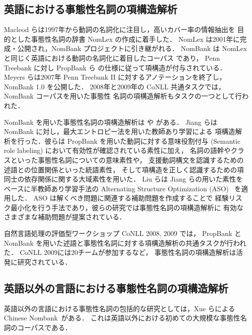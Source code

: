 \documentclass[japanese]{jnlp_1.4}
\begin{document}
\subsection{英語における事態性名詞の項構造解析}

Macleod らは1997年から動詞の名詞化に注目し，高いカバー率の情報抽出を
目的とした事態性名詞の辞書 NomLex の作成に着手した\cite{macleod:1997:RANLP}．
NomLex は2001年に完成・公開され，NomBank プロジェクトに引き継がれる．
NomBank は NomLex と同じく英語における動詞の名詞化に着目したコーパス
\cite{meyers:2004:NAACL-HLT,meyers:2004:LREC}
であり，
Penn Treebank \cite{marcus:1993:CL}に対し
PropBank ら \cite{palmer:2005:CL} の仕様に従って項構造が付与されている．
Meyers らは2007年 Penn Treebank II に対するアノテーションを終了し，
NomBank 1.0 を公開した．
2008年と2009年の CoNLL 共通タスクでは，NomBank コーパスを用いた事態性
名詞の項構造解析もタスクの一つとして行われた．

NomBank を用いた事態性名詞の項構造解析は \cite{jiang:2006:EMNLP}や 
\cite{liu:2007:ACL}がある．
Jiang らは NomBank に対し，最大エントロピー法を用いた教師あり学習による
項構造解析を行った．彼らは PropBank を用いた動詞に対する意味役割付与
(Semantic role labeling) において有効性が確認されている素性に加え，
名詞の語幹やクラスといった事態性名詞についての意味素性や，
支援動詞構文を認識するための述語との位置関係といった統語素性，
そして項構造を正しく認識するための項同士の依存関係に関する大域素性を用いた．
Liu らは Jiang らの用いた素性をベースに半教師あり学習手法の Alternating
Structure Optimization (ASO)~\cite{ando:2005:JMLR} を適用した．
ASO は解くべき問題に関連する補助問題を作成することで
経験リスク最小化を行う手法であり，彼らの研究では事態性名詞の項構造解析に
有効なさまざまな補助問題が提案されている．

自然言語処理の評価型ワークショップ CoNLL 2008, 2009 では，
PropBank と NomBank
を用いた述語と事態性名詞に対する項構造解析の共通タスクが行われた．
CoNLL 2009には20チームが参加するなど，
事態性名詞の項構造解析は活発に研究されている．



\subsection{英語以外の言語における事態性名詞の項構造解析}

英語以外の言語における事態性名詞の包括的な研究としては，Xue らによる
Chinese Nombank~\cite{xue:2006:LREC}がある．
これは英語以外における初めての大規模な事態性名詞のコーパスである．
\end{document}
